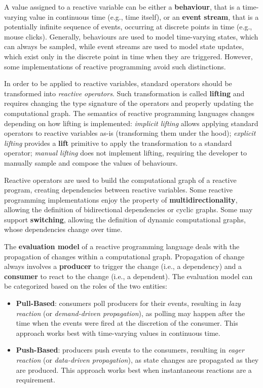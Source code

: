 A value assigned to a reactive variable can be either a \textbf{behaviour},
that is a time-varying value in continuous time (e.g., time itself), or an
\textbf{event stream}, that is a potentially infinite sequence of events,
occurring at discrete points in time (e.g., mouse clicks). Generally,
behaviours are used to model time-varying states, which can always be sampled,
while event streams are used to model state updates, which exist only in the
discrete point in time when they are triggered. However, some implementations
of reactive programming avoid such distinctions.

In order to be applied to reactive variables, standard operators should be
transformed into \textit{reactive operators}. Such transformation is called
\textbf{lifting} and requires changing the type signature of the operators and
properly updating the computational graph. The semantics of reactive
programming languages changes depending on how lifting is implemented:
\textit{implicit lifting} allows applying standard operators to reactive
variables as-is (transforming them under the hood); \textit{explicit lifting}
provides a \textbf{lift} primitive to apply the transformation to a standard
operator; \textit{manual lifting} does not implement lifting, requiring the
developer to manually sample and compose the values of behaviours.

Reactive operators are used to build the computational graph of a reactive
program, creating dependencies between reactive variables. Some reactive
programming implementations enjoy the property of \textbf{multidirectionality},
allowing the definition of bidirectional dependencies or cyclic graphs. Some
may support \textbf{switching}, allowing the definition of dynamic
computational graphs, whose dependencies change over time.

The \textbf{evaluation model} of a reactive programming language deals with the
propagation of changes within a computational graph. Propagation of change
always involves a \textbf{producer} to trigger the change (i.e., a dependency)
and a \textbf{consumer} to react to the change (i.e., a dependent). The
evaluation model can be categorized based on the roles of the two entities:
\begin{itemize}
  \item \textbf{Pull-Based}: consumers poll producers for their events,
        resulting in \textit{lazy reaction} (or \textit{demand-driven propagation}),
        as polling may happen after the time when the events were fired at the
        discretion of the consumer. This approach works best with time-varying
        values in continuous time.
  \item \textbf{Push-Based}: producers push events to the consumers, resulting
        in \textit{eager reaction} (or \textit{data-driven propagation}), as
        state changes are propagated as they are produced. This approach works
        best when instantaneous reactions are a requirement.
\end{itemize}

